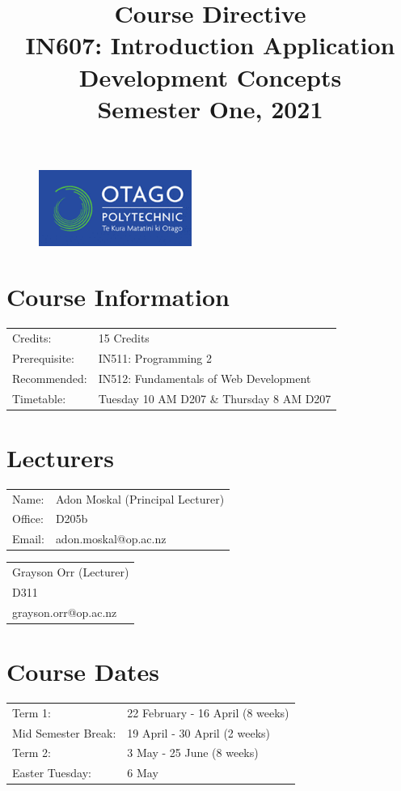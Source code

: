 \documentclass{article}
\author{}
\begin{document}
\begin{figure}
	\includegraphics[width=50mm]{./img/logo.png}
\end{figure}

\title{Course Directive\\IN607: Introduction Application Development Concepts\\Semester One, 2021}
\date{}
\maketitle

\section*{Course Information}
\begin{tabular}{ll}
	Credits:            & 15 Credits                             \\
	Prerequisite:       & IN511: Programming 2                   \\
	Recommended:        & IN512: Fundamentals of Web Development \\
	Timetable:  & Tuesday 10 AM D207 \& Thursday 8 AM D207       
\end{tabular} 

\section*{Lecturers}
\begin{tabular}{ll}
	Name:   & Adon Moskal (Principal Lecturer) \\
	Office: & D205b                            \\
	Email:  & adon.moskal@op.ac.nz             \\
\end{tabular}
\begin{tabular}{l}
	Grayson Orr (Lecturer) \\
	D311                   \\
	grayson.orr@op.ac.nz   \\
\end{tabular}

\section*{Course Dates}
\begin{tabular}{ll}
	Term 1:             & 22 February - 16 April (8 weeks) \\
	Mid Semester Break: & 19 April - 30 April (2 weeks)    \\
	Term 2:             & 3 May - 25 June (8 weeks)        \\     
	Easter Tuesday:     & 6 May                            \\                 
\end{tabular}
\end{document}
